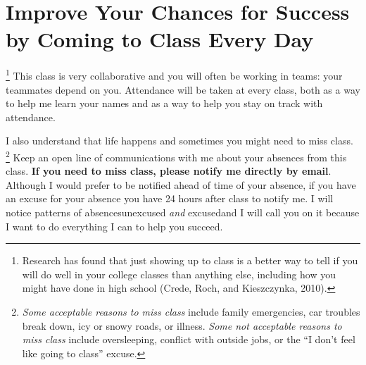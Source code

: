 \section{Improve Your Chances for Success by Coming to Class Every Day}
\footnote{Research has found that just showing up to class is a better way to tell if you will do well in your college classes than anything else, including how you might have done in high school (Crede, Roch, and Kieszczynka, 2010).} This class is very collaborative and you will often be working in teams: your teammates depend on you. Attendance will be taken at every class, both as a way to help me learn your names and as a way to help you stay on track with attendance.

I also understand that life happens and sometimes you might need to miss class. \footnote{\textit{Some acceptable reasons to miss class} include family emergencies, car troubles break down, icy or snowy roads, or illness. \textit{Some not acceptable reasons to miss class} include oversleeping, conflict with outside jobs, or the \enquote{I don't feel like going to class} excuse.} Keep an open line of communications with me about your absences from this class. \textbf{If you need to miss class, please notify me directly by email}. Although I would prefer to be notified ahead of time of your absence, if you have an excuse for your absence you have 24 hours after class to notify me. I will notice patterns of absences\textemdash{}unexcused \emph{and} excused\textemdash{}and I will call you on it because I want to do everything I can to help you succeed.
